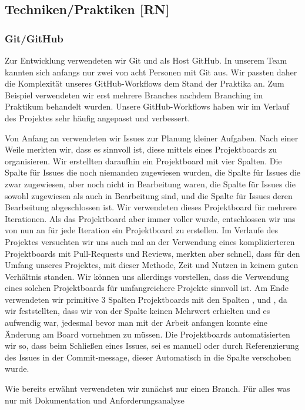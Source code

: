 \documentclass[10pt]{article}
\begin{document}
\subsection{Techniken/Praktiken [RN]}
\subsubsection{Git/GitHub}
Zur Entwicklung verwendeten wir Git und als Host GitHub. In unserem Team kannten sich anfangs nur zwei von acht Personen
mit Git aus. Wir passten daher die Komplexität unseres GitHub-Workflows dem Stand der Praktika an. Zum Beispiel
verwendeten wir erst mehrere Branches nachdem Branching im Praktikum behandelt wurden. Unsere GitHub-Workflows haben
wir im Verlauf des Projektes sehr häufig angepasst und verbessert.\par
\medskip
Von Anfang an verwendeten wir Issues zur Planung kleiner Aufgaben. Nach einer Weile merkten wir, dass es sinnvoll
ist, diese mittels eines Projektboards zu organisieren. Wir erstellten daraufhin ein Projektboard mit vier Spalten.
Die Spalte  für Issues die noch niemanden zugewiesen wurden, die Spalte  für Issues die
zwar zugewiesen, aber noch nicht in Bearbeitung waren, die Spalte  für Issues die sowohl zugewiesen
als auch in Bearbeitung sind, und die Spalte  für Issues deren Bearbeitung abgeschlossen ist.
Wir verwendeten dieses Projektboard für mehrere Iterationen. Als das Projektboard aber immer voller wurde, entschlossen wir uns
von nun an für jede Iteration ein Projektboard zu erstellen. Im Verlaufe des Projektes versuchten wir uns auch mal
an der Verwendung eines komplizierteren Projektboards mit Pull-Requests und Reviews, merkten aber schnell, dass
für den Umfang unseres Projektes, mit dieser Methode, Zeit und Nutzen in keinem guten Verhältnis standen.
Wir können uns allerdings vorstellen, dass die Verwendung eines solchen Projektboards für umfangreichere Projekte
sinnvoll ist. Am Ende verwendeten wir primitive 3 Spalten Projektboards mit den Spalten ,  und
, da wir feststellten, dass wir von der Spalte  keinen Mehrwert erhielten und es aufwendig
war, jedesmal bevor man mit der Arbeit anfangen konnte eine Änderung am Board vornehmen zu müssen. Die Projektboards
automatisierten wir so, dass beim Schließen eines Issues, sei es manuell oder durch Referenzierung des Issues in
der Commit-message, dieser Automatisch in die Spalte  verschoben wurde.\par
\medskip
Wie bereits erwähnt verwendeten wir zunächst nur einen Branch. Für alles was nur mit Dokumentation und Anforderungsanalyse
\end{document}

